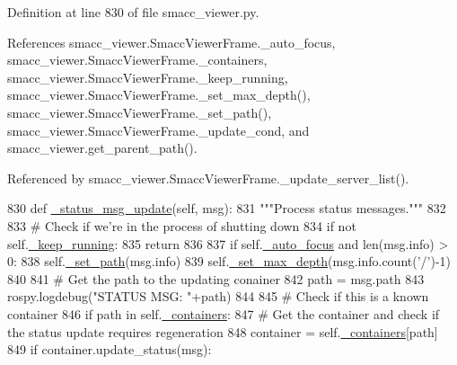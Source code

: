 Definition at line 830 of file smacc\+\_\+viewer.\+py.



References smacc\+\_\+viewer.\+Smacc\+Viewer\+Frame.\+\_\+auto\+\_\+focus, smacc\+\_\+viewer.\+Smacc\+Viewer\+Frame.\+\_\+containers, smacc\+\_\+viewer.\+Smacc\+Viewer\+Frame.\+\_\+keep\+\_\+running, smacc\+\_\+viewer.\+Smacc\+Viewer\+Frame.\+\_\+set\+\_\+max\+\_\+depth(), smacc\+\_\+viewer.\+Smacc\+Viewer\+Frame.\+\_\+set\+\_\+path(), smacc\+\_\+viewer.\+Smacc\+Viewer\+Frame.\+\_\+update\+\_\+cond, and smacc\+\_\+viewer.\+get\+\_\+parent\+\_\+path().



Referenced by smacc\+\_\+viewer.\+Smacc\+Viewer\+Frame.\+\_\+update\+\_\+server\+\_\+list().


\begin{DoxyCode}
830     \textcolor{keyword}{def }\hyperlink{classsmacc__viewer_1_1SmaccViewerFrame_af5e341bd874c8402738aec02cc598cca}{\_status\_msg\_update}(self, msg):
831         \textcolor{stringliteral}{"""Process status messages."""}
832 
833         \textcolor{comment}{# Check if we're in the process of shutting down}
834         \textcolor{keywordflow}{if} \textcolor{keywordflow}{not} self.\hyperlink{classsmacc__viewer_1_1SmaccViewerFrame_a20aa5e983200d5e77d659780d490d285}{\_keep\_running}:
835             \textcolor{keywordflow}{return}
836 
837         \textcolor{keywordflow}{if} self.\hyperlink{classsmacc__viewer_1_1SmaccViewerFrame_a733f65cc99ce9d6effae5c6a87be4989}{\_auto\_focus} \textcolor{keywordflow}{and} len(msg.info) > 0:
838             self.\hyperlink{classsmacc__viewer_1_1SmaccViewerFrame_a7263344a2979e9d989f0142a15d1b1f2}{\_set\_path}(msg.info)
839             self.\hyperlink{classsmacc__viewer_1_1SmaccViewerFrame_a86f358ee6df80b185f70292675070a8d}{\_set\_max\_depth}(msg.info.count(\textcolor{stringliteral}{'/'})-1)
840 
841         \textcolor{comment}{# Get the path to the updating conainer}
842         path = msg.path
843         rospy.logdebug(\textcolor{stringliteral}{"STATUS MSG: "}+path)
844 
845         \textcolor{comment}{# Check if this is a known container}
846         \textcolor{keywordflow}{if} path \textcolor{keywordflow}{in} self.\hyperlink{classsmacc__viewer_1_1SmaccViewerFrame_a00ea07c6cc068340230dcac273ad5e90}{\_containers}:
847             \textcolor{comment}{# Get the container and check if the status update requires regeneration}
848             container = self.\hyperlink{classsmacc__viewer_1_1SmaccViewerFrame_a00ea07c6cc068340230dcac273ad5e90}{\_containers}[path]
849             \textcolor{keywordflow}{if} container.update\_status(msg):

\end{DoxyCode}
